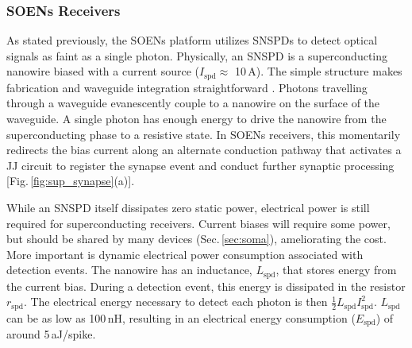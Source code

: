 \documentclass[twocolumn]{article}
\begin{document}
\subsubsection{SOENs Receivers}
As stated previously, the SOENs platform utilizes SNSPDs to detect optical signals as faint as a single photon. Physically, an SNSPD is a superconducting nanowire biased with a current source ($I_{\mathrm{spd}} \approx$ 10\,\textmu A). The simple structure makes fabrication and waveguide integration straightforward \cite{spga2011,pesc2012,akhlaghi2015waveguide,feka2015,saga2015,shbu2017b,ferrari2018waveguide,buta2020}. Photons travelling through a waveguide evanescently couple to a nanowire on the surface of the waveguide. A single photon has enough energy to drive the nanowire from the superconducting phase to a resistive state. In SOENs receivers, this momentarily redirects the bias current along an alternate conduction pathway that activates a JJ circuit to register the synapse event and conduct further synaptic processing [Fig.\,\ref{fig:sup_synapse}(a)].

While an SNSPD itself dissipates zero static power, electrical power is still required for superconducting receivers. Current biases will require some power, but should be shared by many devices (Sec.\,\ref{sec:soma}), ameliorating the cost. More important is dynamic electrical power consumption associated with detection events. The nanowire has an inductance, $L_{\mathrm{spd}}$, that stores energy from the current bias. During a detection event, this energy is dissipated in the resistor $r_{\mathrm{spd}}$. The electrical energy necessary to detect each photon is then $\frac{1}{2}L_{\mathrm{spd}}I_{\mathrm{spd}}^2$. $L_{\mathrm{spd}}$ can be as low as 100\,nH, resulting in an electrical energy consumption ($E_{\mathrm{spd}}$) of around 5\,aJ/spike.
\end{document}
